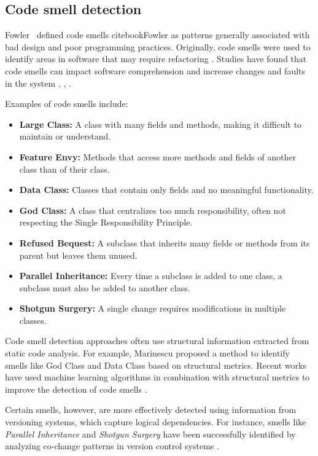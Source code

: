 \subsection{Code smell detection}
Fowler \ defined code smells cite{bookFowler} as patterns generally associated with bad design and poor programming practices. Originally, code smells were used to identify areas in software that may require refactoring \cite{articlesmells}. Studies have found that code smells can impact software comprehension and increase changes and faults in the system \cite{5741260}, \cite{5328703}, \cite{articlefault-proneness}.

Examples of code smells include:

\begin{itemize}
    \item \textbf{Large Class:} A class with many fields and methods, making it difficult to maintain or understand.
    \item \textbf{Feature Envy:} Methods that access more methods and fields of another class than of their class.
    \item \textbf{Data Class:} Classes that contain only fields and no meaningful functionality.
    \item \textbf{God Class:} A class that centralizes too much responsibility, often not respecting the Single Responsibility Principle.
    \item \textbf{Refused Bequest:} A subclass that inherits many fields or methods from its parent but leaves them unused.
    \item \textbf{Parallel Inheritance:} Every time a subclass is added to one class, a subclass must also be added to another class.
    \item \textbf{Shotgun Surgery:} A single change requires modifications in multiple classes.
\end{itemize}

Code smell detection approaches often use structural information extracted from static code analysis. For example, Marinescu \cite{Marinescu} proposed a method to identify smells like God Class and Data Class based on structural metrics. Recent works have used machine learning algorithms in combination with structural metrics to improve the detection of code smells \cite{code-smell-ml, PALOMBA20181}.

Certain smells, however, are more effectively detected using information from versioning systems, which capture logical dependencies. For instance, smells like \textit{Parallel Inheritance} and \textit{Shotgun Surgery} have been successfully identified by analyzing co-change patterns in version control systems \cite{6963448}.


